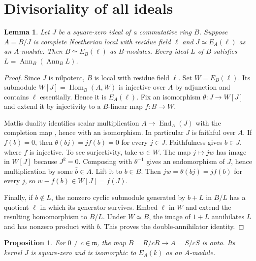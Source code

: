 \documentclass[11pt,reqno]{amsart}
\newtheorem{lemma}[theorem]{Lemma}
\newtheorem{proposition}[theorem]{Proposition}
\DeclareMathOperator{\Ann}{Ann}
\DeclareMathOperator{\End}{End}
\DeclareMathOperator{\Hom}{Hom}
\newcommand{\m}{\mathfrak m}
\begin{document}
\section{Divisoriality of all ideals}

\begin{lemma}\label{lem:ann}
Let \(J\) be a square-zero ideal of a commutative ring \(B\).
Suppose \(A=B/J\) is complete Noetherian local with residue field \(\ell\)
and \(J\simeq E_A(\ell)\) as an \(A\)-module. Then \(B\simeq E_B(\ell)\)
as \(B\)-modules. Every ideal \(L\) of \(B\) satisfies
\(L=\Ann_B(\Ann_B L)\).
\end{lemma}

\begin{proof}
Since \(J\) is nilpotent, \(B\) is local with residue field \(\ell\).
Set \(W=E_B(\ell)\). Its submodule \(W[J]=\Hom_B(A,W)\) is injective over
\(A\) by adjunction and contains \(\ell\) essentially. Hence it is
\(E_A(\ell)\). Fix an isomorphism \(\theta:J\to W[J]\) and extend it by
injectivity to a \(B\)-linear map \(f:B\to W\).

Matlis duality identifies scalar multiplication \(A\to\End_A(J)\) with
the completion map \cite[Lemma~47.7.5]{Stacks}, hence with an isomorphism.
In particular \(J\) is faithful over \(A\). If \(f(b)=0\), then
\(\theta(bj)=jf(b)=0\) for every \(j\in J\). Faithfulness gives \(b\in J\),
where \(f\) is injective. To see surjectivity, take \(w\in W\).
The map \(j\mapsto jw\) has image in \(W[J]\) because \(J^2=0\).
Composing with \(\theta^{-1}\) gives an endomorphism of \(J\), hence
multiplication by some \(\bar b\in A\). Lift it to \(b\in B\). Then
\(jw=\theta(bj)=jf(b)\) for every \(j\), so \(w-f(b)\in W[J]=f(J)\).

Finally, if \(b\notin L\), the nonzero cyclic submodule generated by \(b+L\)
in \(B/L\) has a quotient \(\ell\) in which its generator survives. Embed
\(\ell\) in \(W\) and extend the resulting homomorphism to \(B/L\).
Under \(W\simeq B\), the image of \(1+L\) annihilates \(L\) and has
nonzero product with \(b\). This proves the double-annihilator identity.
\end{proof}

\begin{proposition}\label{prop:quotient}
For \(0\ne c\in\m\), the map \(B=R/cR\to A=S/cS\) is onto. Its kernel
\(J\) is square-zero and is isomorphic to \(E_A(k)\) as an \(A\)-module.
\end{proposition}
\end{document}
